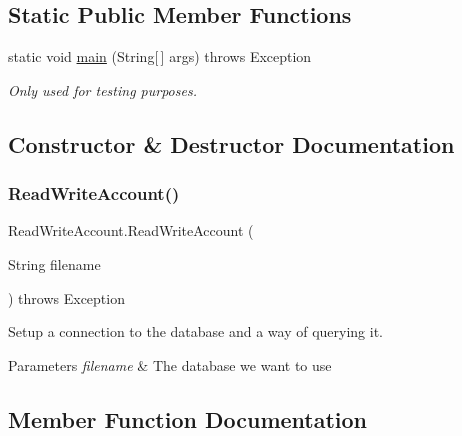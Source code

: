 \subsection*{Static Public Member Functions}
\begin{DoxyCompactItemize}
\item 
\mbox{\label{class_read_write_account_afb480d9aef80c5b153cf14e581a09fb2}} 
static void \hyperlink{class_read_write_account_afb480d9aef80c5b153cf14e581a09fb2}{main} (String\mbox{[}$\,$\mbox{]} args)  throws Exception     
\begin{DoxyCompactList}\small\item\em Only used for testing purposes. \end{DoxyCompactList}\end{DoxyCompactItemize}


\subsection{Constructor \& Destructor Documentation}
\mbox{\label{class_read_write_account_a3c89be0e9259ae04b7b88de6d791f2ff}} 
\subsubsection{\texorpdfstring{Read\+Write\+Account()}{ReadWriteAccount()}}
{\footnotesize\ttfamily Read\+Write\+Account.\+Read\+Write\+Account (\begin{DoxyParamCaption}\item[{String}]{filename }\end{DoxyParamCaption}) throws Exception}



Setup a connection to the database and a way of querying it. 


\begin{DoxyParams}{Parameters}
{\em filename} & The database we want to use \\
\hline
\end{DoxyParams}


\subsection{Member Function Documentation}
\mbox{\label{class_read_write_account_aec86c1bc4029bb3699c85dee12982de8}} 
